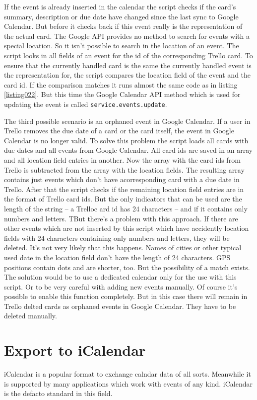 If the event is already inserted in the calendar the script checks if the card's summary, description or due date have changed since the last sync to Google Calendar. But before it checks back if this event really is the representation of the actual card. The Google API provides no method to search for events with a special location. So it isn't possible to search in the location of an event. The script looks in all fields of an event for the id of the corresponding Trello card. To ensure that the currently handled card is the same the currently handled event is the representation for, the script compares the location field of the event and the card id. If the comparison matches it runs almost the same code as in listing \ref{listing022}. But this time the Google Calendar API method which is used for updating the event is called \lstinline{service.events.update}. 

The third possible scenario is an orphaned event in Google Calendar. If a user in Trello removes the due date of a card or the card itself, the event in Google Calendar is no longer valid. To solve this problem the script loads all cards with due dates and all events from Google Calendar. All card ids are saved in an array and all location field entries in another. Now the array with the card ids from Trello is subtracted from the array with the location fields. The resulting array contains just events which don't have acorresponding card with a due date in Trello. After that the script checks if the remaining location field entries are in the format of Trello card ids. But the only indicators that can be used are the length of the string – a Trelloc ard id has 24 characters – and if it contains only numbers and letters. TBut there's a problem with this approach. If there are other events which are not inserted by this script which have accidently location fields with 24 characters containing only numbers and letters, they will be deleted. It's not very likely that this happens. Names of cities or other typical used date in the location field don't have the length of 24 characters. GPS positions contain dots and are shorter, too. But the possibility of a match exists. The solution would be to use a dedicated calendar only for the use with this script. Or to be very careful with adding new events manually. Of course it's possible to enable this function completely. But in this case there will remain in Trello delted cards as orphaned events in Google Calendar. They have to be deleted manually.

\section{Export to iCalendar}
iCalendar is a popular format to exchange calndar data of all sorts. Meanwhile it is supported by many applications which work with events of any kind. iCalendar is the defacto standard in this field.

